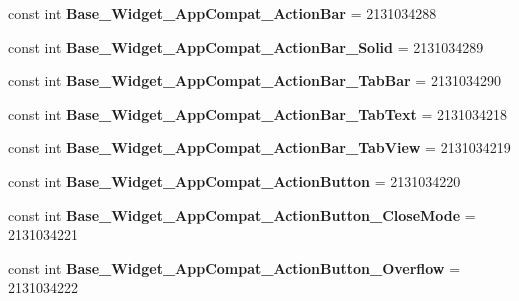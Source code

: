 \begin{DoxyCompactItemize}
\item 
\hypertarget{classClient_1_1Droid_1_1Resource_1_1Style_a29d23b89fd3b44daceef9b3c8149f93c}{}const int {\bfseries Base\+\_\+\+Widget\+\_\+\+App\+Compat\+\_\+\+Action\+Bar} = 2131034288\label{classClient_1_1Droid_1_1Resource_1_1Style_a29d23b89fd3b44daceef9b3c8149f93c}

\item 
\hypertarget{classClient_1_1Droid_1_1Resource_1_1Style_aae41870ecb3f5290b1ebfa06f38bd0d2}{}const int {\bfseries Base\+\_\+\+Widget\+\_\+\+App\+Compat\+\_\+\+Action\+Bar\+\_\+\+Solid} = 2131034289\label{classClient_1_1Droid_1_1Resource_1_1Style_aae41870ecb3f5290b1ebfa06f38bd0d2}

\item 
\hypertarget{classClient_1_1Droid_1_1Resource_1_1Style_a06767a30c35970dc54a1c78ac10ae1c1}{}const int {\bfseries Base\+\_\+\+Widget\+\_\+\+App\+Compat\+\_\+\+Action\+Bar\+\_\+\+Tab\+Bar} = 2131034290\label{classClient_1_1Droid_1_1Resource_1_1Style_a06767a30c35970dc54a1c78ac10ae1c1}

\item 
\hypertarget{classClient_1_1Droid_1_1Resource_1_1Style_aedc5afc7a30d963a6097ff8dafd75697}{}const int {\bfseries Base\+\_\+\+Widget\+\_\+\+App\+Compat\+\_\+\+Action\+Bar\+\_\+\+Tab\+Text} = 2131034218\label{classClient_1_1Droid_1_1Resource_1_1Style_aedc5afc7a30d963a6097ff8dafd75697}

\item 
\hypertarget{classClient_1_1Droid_1_1Resource_1_1Style_a645e8ece6aaa4e71b641f35da4b5915b}{}const int {\bfseries Base\+\_\+\+Widget\+\_\+\+App\+Compat\+\_\+\+Action\+Bar\+\_\+\+Tab\+View} = 2131034219\label{classClient_1_1Droid_1_1Resource_1_1Style_a645e8ece6aaa4e71b641f35da4b5915b}

\item 
\hypertarget{classClient_1_1Droid_1_1Resource_1_1Style_a08d8b6042217a14ba32c60564f80d2a0}{}const int {\bfseries Base\+\_\+\+Widget\+\_\+\+App\+Compat\+\_\+\+Action\+Button} = 2131034220\label{classClient_1_1Droid_1_1Resource_1_1Style_a08d8b6042217a14ba32c60564f80d2a0}

\item 
\hypertarget{classClient_1_1Droid_1_1Resource_1_1Style_a451e23e9426eed1d4859565342df1dde}{}const int {\bfseries Base\+\_\+\+Widget\+\_\+\+App\+Compat\+\_\+\+Action\+Button\+\_\+\+Close\+Mode} = 2131034221\label{classClient_1_1Droid_1_1Resource_1_1Style_a451e23e9426eed1d4859565342df1dde}

\item 
\hypertarget{classClient_1_1Droid_1_1Resource_1_1Style_abe41b166d1695a64463948642da399b9}{}const int {\bfseries Base\+\_\+\+Widget\+\_\+\+App\+Compat\+\_\+\+Action\+Button\+\_\+\+Overflow} = 2131034222\label{classClient_1_1Droid_1_1Resource_1_1Style_abe41b166d1695a64463948642da399b9}


\end{DoxyCompactItemize}
